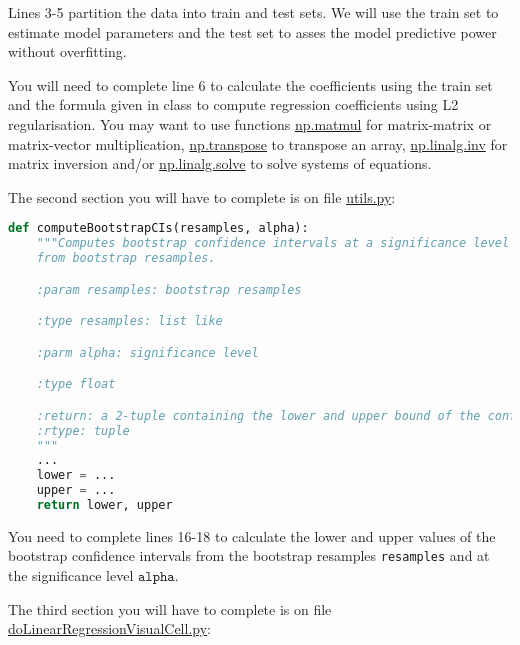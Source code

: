 \documentclass[12pt]{article}
\begin{document}
Lines 3-5 partition the data into train and test sets. We will use the train
set to estimate model parameters and the test set to asses the model predictive
power without overfitting.

You will need to complete line 6 to calculate the coefficients using the train
set and the formula given in class to compute regression coefficients using
L2 regularisation. You may want to use functions
\href{https://numpy.org/doc/stable/reference/generated/numpy.matmul.html}{np.matmul} for
matrix-matrix or matrix-vector multiplication,
\href{https://numpy.org/doc/stable/reference/generated/numpy.transpose.html}{np.transpose}
to transpose an array,
\href{https://numpy.org/doc/stable/reference/generated/numpy.linalg.inv.html}{np.linalg.inv}
for matrix inversion and/or
\href{https://numpy.org/doc/stable/reference/generated/numpy.linalg.solve.html}{np.linalg.solve}
to solve systems of equations.

The second section you will have to complete is on file
\href{https://github.com/joacorapela/neuroinformatics24/blob/master/worksheets/06_linearRegression/code/scripts/utils.py}{utils.py}:

\begin{lstlisting}[language=python]
def computeBootstrapCIs(resamples, alpha):
    """Computes bootstrap confidence intervals at a significance level alpha
    from bootstrap resamples.

    :param resamples: bootstrap resamples

    :type resamples: list like

    :parm alpha: significance level

    :type float

    :return: a 2-tuple containing the lower and upper bound of the confidence interval.
    :rtype: tuple
    """
    ...
    lower = ...
    upper = ...
    return lower, upper
\end{lstlisting}

You need to complete lines 16-18 to calculate the lower and upper values of the bootstrap confidence intervals from the bootstrap resamples \texttt{resamples} and at the significance level $\texttt{alpha}$.

The third section you will have to complete is on file
\href{https://github.com/joacorapela/neuroinformatics24/blob/master/worksheets/06_linearRegression/code/scripts/https://github.com/joacorapela/neuroinformatics24/blob/master/worksheets/06_linearRegression/code/scripts/doLinearRegressionVisualCell.py}{doLinearRegressionVisualCell.py}:
\end{document}
